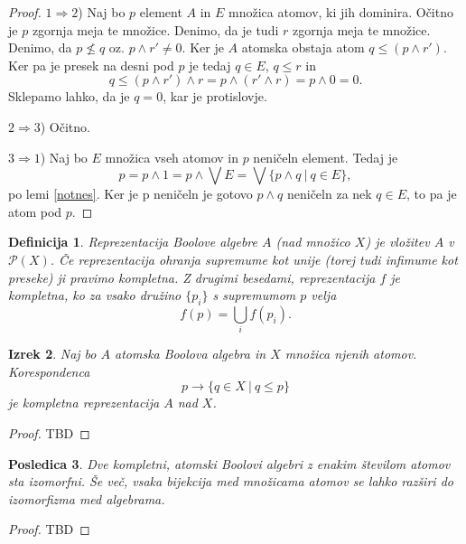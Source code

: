 \documentclass{amsart}
\newtheorem{izrek}{Izrek}[section]
\newtheorem{posledica}[izrek]{Posledica}
\newtheorem{definicija}[izrek]{Definicija}
\begin{document}
\begin{proof}
    \(1 \Rightarrow 2\)) Naj bo $p$ element $A$ in $E$ množica atomov, ki 
    jih dominira. Očitno je $p$ zgornja meja te množice. Denimo, da je tudi $r$ 
    zgornja meja te množice. Denimo, da \(p \nleq q\) oz. \(p \wedge  r' \neq 0\).
    Ker je $A$ atomska obstaja atom \(q \leq (p \wedge r')\). Ker pa je presek 
    na desni pod $p$ je tedaj $q \in E$, $q \leq r$ in
    \[q \leq (p \wedge r') \wedge r = p \wedge (r' \wedge r) = p \wedge 0 = 0.\]
    Sklepamo lahko, da je $q = 0$, kar je protislovje.

    \(2 \Rightarrow 3\)) Očitno. 


    \(3 \Rightarrow 1\)) Naj bo \(E\) množica vseh atomov in $p$ neničeln element.
    Tedaj je 
    \[p = p \wedge 1 = p \wedge \bigvee E = \bigvee \{p \wedge q~|~q\in E\},\]
    po lemi \ref*{notnes}. Ker je p neničeln je gotovo \(p \wedge q\) neničeln 
    za nek \(q \in E\), to pa je atom pod \(p\).
\end{proof}

\begin{definicija}
    Reprezentacija Boolove algebre $A$ (nad množico $X$) je vložitev $A$
    v \(\mathcal{P}(X)\). Če reprezentacija ohranja supremume kot unije
    (torej tudi infimume kot preseke) ji pravimo kompletna. Z drugimi besedami, 
    reprezentacija $f$ je kompletna, ko za vsako družino \(\{p_i\}\)
    s supremumom \(p\) velja 
    \[f(p) = \bigcup_i f(p_i).\]
\end{definicija}

\begin{izrek}
    Naj bo $A$ atomska Boolova algebra in $X$ množica njenih atomov.
    Korespondenca
    \[p \to \{q\in X~|~q\leq p\}\]
    je kompletna reprezentacija $A$ nad $X$.
\end{izrek}

\begin{proof}
    TBD
\end{proof}

\begin{posledica}
    Dve kompletni, atomski Boolovi algebri z enakim številom atomov sta izomorfni.
    Še več, vsaka bijekcija med množicama atomov se lahko razširi do 
    izomorfizma med algebrama.
\end{posledica}

\begin{proof}
    TBD
\end{proof}



\end{document}
